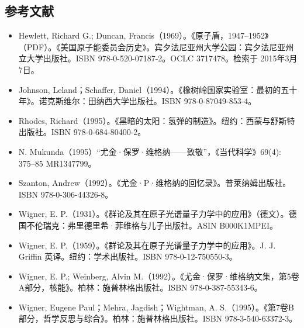 \subsection{参考文献}
\begin{itemize}
\item Hewlett, Richard G.; Duncan, Francis（1969）。《原子盾，1947–1952》（PDF）。《美国原子能委员会历史》。宾夕法尼亚州大学公园：宾夕法尼亚州立大学出版社。ISBN 978-0-520-07187-2。OCLC 3717478。检索于 2015年3月7日。
\item Johnson, Leland；Schaffer, Daniel（1994）。《橡树岭国家实验室：最初的五十年》。诺克斯维尔：田纳西大学出版社。ISBN 978-0-87049-853-4。
\item Rhodes, Richard（1995）。《黑暗的太阳：氢弹的制造》。纽约：西蒙与舒斯特出版社。ISBN 978-0-684-80400-2。
\item N. Mukunda（1995）“尤金·保罗·维格纳——致敬”，《当代科学》69(4): 375–85 MR1347799。
\item Szanton, Andrew（1992）。《尤金·P·维格纳的回忆录》。普莱纳姆出版社。ISBN 978-0-306-44326-8。
\item Wigner, E. P.（1931）。《群论及其在原子光谱量子力学中的应用》（德文）。德国不伦瑞克：弗里德里希·菲维格与儿子出版社。ASIN B000K1MPEI。
\item Wigner, E. P.（1959）。《群论及其在原子光谱量子力学中的应用》。J. J. Griffin 英译。纽约：学术出版社。ISBN 978-0-12-750550-3。
\item Wigner, E. P.; Weinberg, Alvin M.（1992）。《尤金·保罗·维格纳文集，第5卷A部分，核能》。柏林：施普林格出版社。ISBN 978-0-387-55343-6。
\item Wigner, Eugene Paul；Mehra, Jagdish；Wightman, A. S.（1995）。《第7卷B部分，哲学反思与综合》。柏林：施普林格出版社。ISBN 978-3-540-63372-3。
\end{itemize}
